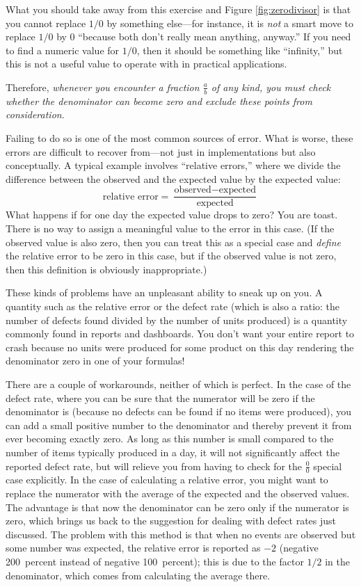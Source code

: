 What you should take away from this exercise and Figure
\ref{fig:zerodivisor} is that you cannot replace $1/0$ by something
else---for instance, it is \emph{not} a smart move to replace $1/0$ by
$0$ ``because both don't really mean anything, anyway.'' If you need
to find a numeric value for $1/0$, then it should be something like
``infinity,'' but this is not a useful value to operate with in
practical applications.

Therefore, \emph{whenever you encounter a fraction $\frac{a}{b}$ of
  any kind,  you \emph{must} check whether the denominator can become
  zero and exclude these points from consideration}.

Failing to do so is one of the most common sources of error.  What is
worse, these errors are difficult to recover from---not just in
implementations but also\vadjust{\pagebreak} conceptually. A typical example involves
``relative errors,'' where we divide the difference between the
observed and the expected value by the expected value:
%
\[
\text{relative error} 
= \frac{\text{observed} - \text{expected}}{\text{expected}}
\]
%
What happens if for one day the expected value drops to zero?  You are
toast. There is no way to assign a meaningful value to the error in
this case. (If the observed value is also zero, then you can treat
this as a special case and \emph{define} the relative error to be zero
in this case, but if the observed value is not zero, then this
definition is obviously inappropriate.)

These kinds of problems have an unpleasant ability to sneak up on you.
A quantity such as the relative error or the defect rate (which is
also a ratio: the number of defects found divided by the number of
units produced) is a quantity commonly found in reports and
dashboards. You don't want your entire report to crash because no
units were produced for some product on this day rendering the
denominator zero in one of your formulas!

There are a couple of workarounds, neither of which is perfect. In the
case of the defect rate, where you can be sure that the numerator will
be zero if the denominator is (because no defects can be found if no
items were produced), you can add a small positive number to the
denominator and thereby prevent it from ever becoming exactly zero. As
long as this number is small compared to the number of items typically
produced in a day, it will not significantly affect the reported
defect rate, but will relieve you from having to check for the
$\frac{0}{0}$ special case explicitly. In the case of calculating a
relative error, you might want to replace the numerator with the
average of the expected and the observed values. The advantage is that
now the denominator can be zero only\vadjust{\pagebreak} if the numerator is zero, which
brings us back to the suggestion for dealing with defect rates just
discussed. The problem with this method is that when no events are
observed but some number was expected, the relative error is reported
as $-2$ (negative 200~percent instead of negative 100~percent); this is due to the
factor $1/2$ in the denominator, which comes from calculating the
average there.

